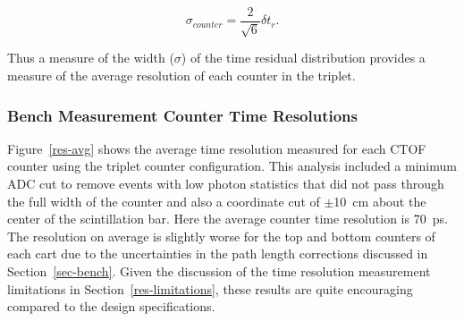 \documentclass{elsart}
\begin{document}
\begin{equation}
\label{sig-counter}
\sigma_{counter} = \frac{2}{\sqrt{6}} \delta t_r.
\end{equation}

\noindent
Thus a measure of the width ($\sigma$) of the time residual distribution provides a measure of the
average resolution of each counter in the triplet. 

\subsubsection{Bench Measurement Counter Time Resolutions}
\label{bench-tres}

Figure~\ref{res-avg} shows the average time resolution measured for each CTOF counter using the
triplet counter configuration. This analysis included a minimum ADC cut to remove events with low
photon statistics that did not pass through the full width of the counter and also a coordinate cut of
$\pm$10~cm about the center of the scintillation bar. Here the average counter time resolution is
70~ps. The resolution on average is slightly worse for the top and bottom counters of each cart due
to the uncertainties in the path length corrections discussed in Section~\ref{sec-bench}. Given the
discussion of the time resolution measurement limitations in Section~\ref{res-limitations}, these
results are quite encouraging compared to the design specifications.
\end{document}
